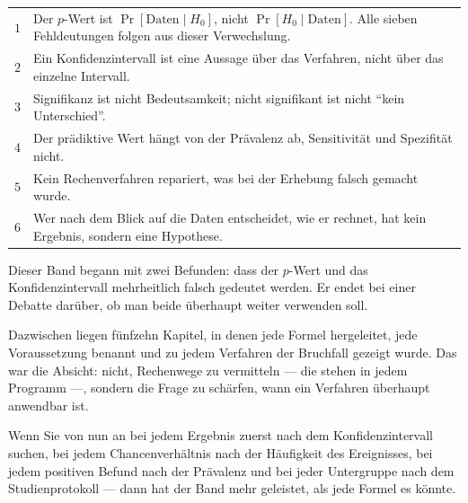 \begin{merksatz}
\begin{center}
{\small
\renewcommand{\arraystretch}{1.55}
\begin{tabular}{@{}P{0.7cm}P{7.7cm}@{}}
\toprule
$1$ & Der $p$-Wert ist $\Pr[\text{Daten} \mid H_0]$, nicht $\Pr[H_0 \mid \text{Daten}]$. Alle sieben Fehldeutungen folgen aus dieser Verwechslung.\\
$2$ & Ein Konfidenzintervall ist eine Aussage über das Verfahren, nicht über das einzelne Intervall.\\
$3$ & Signifikanz ist nicht Bedeutsamkeit; nicht signifikant ist nicht \enquote{kein Unterschied}.\\
$4$ & Der prädiktive Wert hängt von der Prävalenz ab, Sensitivität und Spezifität nicht.\\
$5$ & Kein Rechenverfahren repariert, was bei der Erhebung falsch gemacht wurde.\\
$6$ & Wer nach dem Blick auf die Daten entscheidet, wie er rechnet, hat kein Ergebnis, sondern eine Hypothese.\\
\bottomrule
\end{tabular}}
\end{center}
\end{merksatz}

\begin{merksatz}
\begin{center}
\begin{minipage}{0.9\textwidth}
Dieser Band begann mit zwei Befunden: dass der $p$-Wert und das Konfidenzintervall mehrheitlich falsch gedeutet werden. Er endet bei einer Debatte darüber, ob man beide überhaupt weiter verwenden soll.

Dazwischen liegen fünfzehn Kapitel, in denen jede Formel hergeleitet, jede Voraussetzung benannt und zu jedem Verfahren der Bruchfall gezeigt wurde. Das war die Absicht: nicht, Rechenwege zu vermitteln --- die stehen in jedem Programm ---, sondern die Frage zu schärfen, wann ein Verfahren überhaupt anwendbar ist.

Wenn Sie von nun an bei jedem Ergebnis zuerst nach dem Konfidenzintervall suchen, bei jedem Chancenverhältnis nach der Häufigkeit des Ereignisses, bei jedem positiven Befund nach der Prävalenz und bei jeder Untergruppe nach dem Studienprotokoll --- dann hat der Band mehr geleistet, als jede Formel es könnte.
\end{minipage}
\end{center}

\begin{center}
\begin{minipage}{0.88\textwidth}
\end{minipage}
\end{center}
\end{merksatz}
